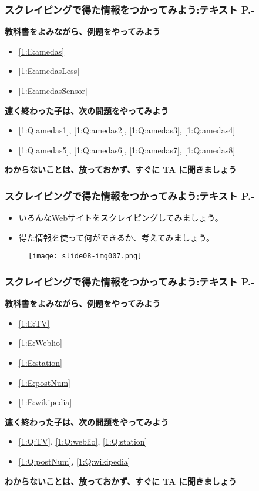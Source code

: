 \begin{frame}[fragile]
	\frametitle{\large{スクレイピングで得た情報をつかってみよう:テキスト P.\pageref{1:P:scraping}-}~~~}
      \textbf{教科書をよみながら、例題をやってみよう}
				\begin{itemize}
					\item \ref*{1:E:amedas}
					\item \ref*{1:E:amedasLess}
					\item \ref*{1:E:amedasSensor}
				\end{itemize}
      \vfill
      \textbf{速く終わった子は、次の問題をやってみよう}
				\begin{itemize}
					\item \ref*{1:Q:amedas1}, \ref*{1:Q:amedas2}, \ref*{1:Q:amedas3}, \ref*{1:Q:amedas4}
					\item \ref*{1:Q:amedas5}, \ref*{1:Q:amedas6}, \ref*{1:Q:amedas7}, \ref*{1:Q:amedas8}
				\end{itemize}
      \vfill
      \textbf{わからないことは、放っておかず、すぐに TA に聞きましょう}
\end{frame}

\begin{frame}[fragile]
	\frametitle{\large{スクレイピングで得た情報をつかってみよう:テキスト P.\pageref{1:P:scraping}-}~~~}
    \begin{itemize}
        \item いろんなWebサイトをスクレイピングしてみましょう。
        \item 得た情報を使って何ができるか、考えてみましょう。
    \end{itemize}
    \begin{figure}
      \centering
      \texttt{[image: slide08-img007.png]}
    \end{figure}
\end{frame}

\begin{frame}[fragile]
	\frametitle{\large{スクレイピングで得た情報をつかってみよう:テキスト P.\pageref{1:P:scraping}-}~~~}
      \textbf{教科書をよみながら、例題をやってみよう}
				\begin{itemize}
					\item \ref*{1:E:TV}
					\item \ref*{1:E:Weblio}
					\item \ref*{1:E:station}
					\item \ref*{1:E:postNum}
					\item \ref*{1:E:wikipedia}
				\end{itemize}
      \vfill
      \textbf{速く終わった子は、次の問題をやってみよう}
				\begin{itemize}
					\item \ref*{1:Q:TV}, \ref*{1:Q:weblio}, \ref*{1:Q:station}
					\item \ref*{1:Q:postNum}, \ref*{1:Q:wikipedia}
				\end{itemize}
      \vfill
      \textbf{わからないことは、放っておかず、すぐに TA に聞きましょう}
\end{frame}

